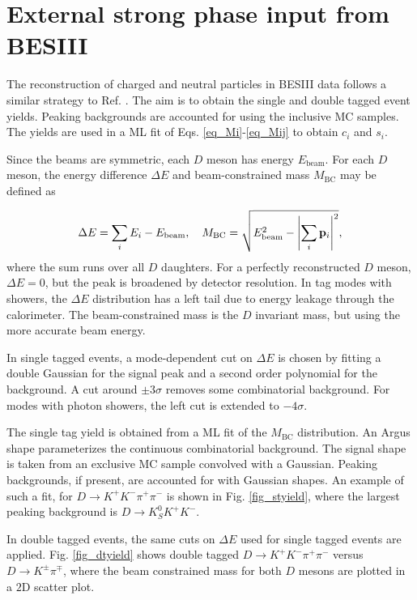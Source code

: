 \documentclass[12pt, a4paper, notitlepage, onecolumn]{article}
\numberwithin{equation}{section}
\begin{document}
\section{External strong phase input from BESIII}
\noindent The reconstruction of charged and neutral particles in BESIII data follows a similar strategy to Ref. \cite{cite_KSKKAnalysis}. The aim is to obtain the single and double tagged event yields. Peaking backgrounds are accounted for using the inclusive MC samples. The yields are used in a ML fit of Eqs. \eqref{eq_Mi}-\eqref{eq_Mij} to obtain $c_i$ and $s_i$.

Since the beams are symmetric, each $D$ meson has energy $E_\text{beam}$. For each $D$ meson, the energy difference $\Delta E$ and beam-constrained mass $M_\text{BC}$ may be defined as

\begin{equation*}
  \Delta E = \sum_i E_i - E_\text{beam}, \quad M_\text{BC} = \sqrt{E_\text{beam}^2 - \abs{\sum_i\vb{p}_i}^2},
\end{equation*}
where the sum runs over all $D$ daughters. For a perfectly reconstructed $D$ meson, $\Delta E = 0$, but the peak is broadened by detector resolution. In tag modes with showers, the $\Delta E$ distribution has a left tail due to energy leakage through the calorimeter. The beam-constrained mass is the $D$ invariant mass, but using the more accurate beam energy.

In single tagged events, a mode-dependent cut on $\Delta E$ is chosen by fitting a double Gaussian for the signal peak and a second order polynomial for the background. A cut around $\pm 3\sigma$ removes some combinatorial background. For modes with photon showers, the left cut is extended to $-4\sigma$.

The single tag yield is obtained from a ML fit of the $M_\text{BC}$ distribution. An Argus shape parameterizes the continuous combinatorial background. The signal shape is taken from an exclusive MC sample convolved with a Gaussian. Peaking backgrounds, if present, are accounted for with Gaussian shapes. An example of such a fit, for $D\to K^+K^-\pi^+\pi^-$ is shown in Fig. \ref{fig_styield}, where the largest peaking background is $D\to K_S^0K^+K^-$.

In double tagged events, the same cuts on $\Delta E$ used for single tagged events are applied. Fig. \ref{fig_dtyield} shows double tagged $D\to K^+K^-\pi^+\pi^-$ versus $D\to K^\pm\pi^\mp$, where the beam constrained mass for both $D$ mesons are plotted in a $2$D scatter plot.
\end{document}

